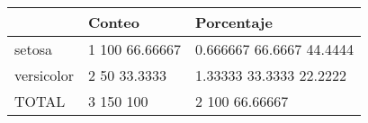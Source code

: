 \begin{tabular}{lll}
& Conteo & Porcentaje \\ 
\hline 
setosa & 1           100      66.66667 & 0.666667      66.6667      44.4444 \\ 
versicolor & 2           50      33.3333 & 1.33333      33.3333      22.2222 \\ 
TOTAL & 3  150  100 & 2           100      66.66667 \\ 
\hline 
\end{tabular}